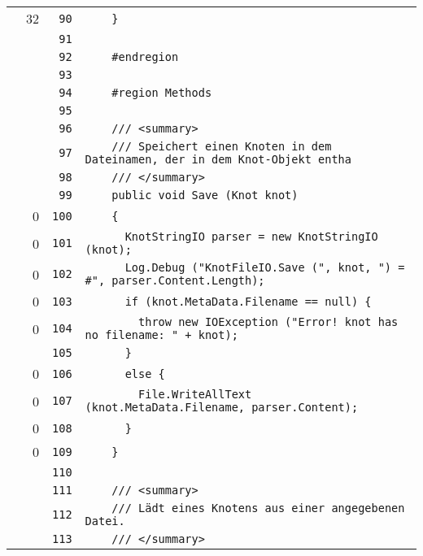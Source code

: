 \documentclass[a4paper,10pt]{article}
\begin{document}
\begin{longtable}[l]{lrrl}
\cellcolor{green} & 32 & \verb~90~ & \verb~    }~\\
\cellcolor{gray} &  & \verb~91~ & \verb~~\\
\cellcolor{gray} &  & \verb~92~ & \verb~    #endregion~\\
\cellcolor{gray} &  & \verb~93~ & \verb~~\\
\cellcolor{gray} &  & \verb~94~ & \verb~    #region Methods~\\
\cellcolor{gray} &  & \verb~95~ & \verb~~\\
\cellcolor{gray} &  & \verb~96~ & \verb~    /// <summary>~\\
\cellcolor{gray} &  & \verb~97~ & \verb~    /// Speichert einen Knoten in dem Dateinamen, der in dem Knot-Objekt entha~\\
\cellcolor{gray} &  & \verb~98~ & \verb~    /// </summary>~\\
\cellcolor{gray} &  & \verb~99~ & \verb~    public void Save (Knot knot)~\\
\cellcolor{red} & 0 & \verb~100~ & \verb~    {~\\
\cellcolor{red} & 0 & \verb~101~ & \verb~      KnotStringIO parser = new KnotStringIO (knot);~\\
\cellcolor{red} & 0 & \verb~102~ & \verb~      Log.Debug ("KnotFileIO.Save (", knot, ") = #", parser.Content.Length);~\\
\cellcolor{red} & 0 & \verb~103~ & \verb~      if (knot.MetaData.Filename == null) {~\\
\cellcolor{red} & 0 & \verb~104~ & \verb~        throw new IOException ("Error! knot has no filename: " + knot);~\\
\cellcolor{gray} &  & \verb~105~ & \verb~      }~\\
\cellcolor{red} & 0 & \verb~106~ & \verb~      else {~\\
\cellcolor{red} & 0 & \verb~107~ & \verb~        File.WriteAllText (knot.MetaData.Filename, parser.Content);~\\
\cellcolor{red} & 0 & \verb~108~ & \verb~      }~\\
\cellcolor{red} & 0 & \verb~109~ & \verb~    }~\\
\cellcolor{gray} &  & \verb~110~ & \verb~~\\
\cellcolor{gray} &  & \verb~111~ & \verb~    /// <summary>~\\
\cellcolor{gray} &  & \verb~112~ & \verb~    /// Lädt eines Knotens aus einer angegebenen Datei.~\\
\cellcolor{gray} &  & \verb~113~ & \verb~    /// </summary>~\\

\end{longtable}
\end{document}
